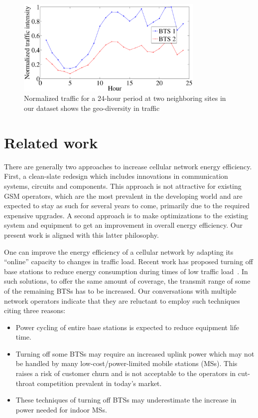 \begin{figure}
\centering
{\includegraphics[width=0.8\textwidth]{pics/traffic.eps}
\caption{Normalized traffic for a 24-hour period at two neighboring sites in our dataset shows the geo-diversity in traffic}
\label{fig:traffic}
}
\end{figure}

\section{Related work}
\label{sec:case2:related}
There are generally two approaches to increase cellular network
energy efficiency. First, a clean-slate redesign which includes
innovations in communication systems, circuits and components.
This approach is not attractive for existing GSM operators,
which are the most prevalent in the developing world and are
expected to stay as such for several years to come, primarily due to the required expensive upgrades. A
second approach is to make optimizations to the existing system
and equipment to get an improvement in overall energy
efficiency. Our present work is aligned with this latter
philosophy.

One can improve the energy efficiency of a cellular network by
adapting its ``online'' capacity to changes in traffic load.
Recent work has proposed turning off base stations to reduce
energy consumption during times of low traffic
load~\cite{Louhi:2007:BTSPower:INTELEC,Oh:Comm:2011,Peng:2011:BTSSaving:Mobicom,He:CellularPower:JN:2012}.
In such solutions, to offer the same amount of coverage, the transmit range of some of the remaining BTSs has to be increased. Our conversations with multiple network operators
indicate that they are reluctant to employ such techniques
citing three reasons:
\begin{itemize}
\item Power cycling of entire base stations is expected to
    reduce equipment life time.
\item Turning off some BTSs may require an increased uplink
    power which may not be handled by many low-cost/power-limited mobile
    stations (MSs). This raises a risk of customer churn and is
    not acceptable to the operators in cut-throat
    competition prevalent in today's market.
\item These techniques of turning off BTSs may
    underestimate the increase in power needed for indoor
    MSs.
\end{itemize}

